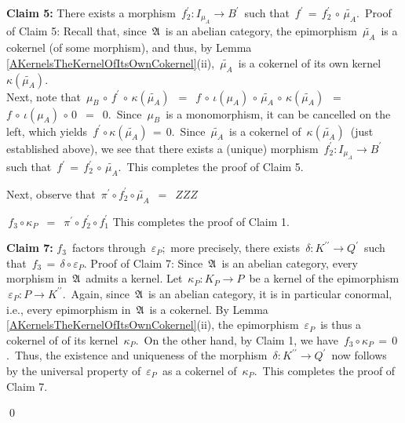 \begin{enumerate}
	\vskip 0.3cm
	\textbf{Claim 5:}\;
	There exists a morphism
	\,$f_{2}^{\prime} : I_{\mu_{A}} \longrightarrow B^{\prime}$\,
	such that
	\,$f^{\prime} \,=\, f_{2}^{\prime} \,\circ\, \widetilde{\mu_{A}}$.\,
	\vskip 0.01cm
	Proof of Claim 5:\;
	Recall that, since \,$\mathfrak{A}$\, is an abelian category,
	the epimorphism \,$\widetilde{\mu_{A}}$\, is a cokernel (of some morphism),
	and thus, by Lemma \ref{AKernelsTheKernelOfItsOwnCokernel}(ii),
	\,$\widetilde{\mu_{A}}$\, is a cokernel of its own kernel
	\,$\kappa(\widetilde{\mu_{A}})$.\,\\
	Next, note that
	\,$\mu_{B} \,\circ\, f^{\prime} \,\circ\, \kappa(\widetilde{\mu_{A}})$
	\,$=$\, $f \,\circ\, \iota(\mu_{A}) \,\circ\, \widetilde{\mu_{A}} \,\circ\, \kappa(\widetilde{\mu_{A}})$
	\,$=$\, $f \,\circ\, \iota(\mu_{A}) \,\circ\, 0$
	\,$=$\, $0$.\,
	Since \,$\mu_{B}$\, is a monomorphism, it can be cancelled on the left,
	which yields
	\,$ f^{\prime} \circ \kappa(\widetilde{\mu_{A}}) \,=\, 0$.\,
	Since \,$\widetilde{\mu_{A}}$\, is a cokernel of \,$\kappa(\widetilde{\mu_{A}})$\, (just established above),
	we see that there exists a (unique) morphism
	\,$f_{2}^{\prime} : I_{\mu_{A}} \longrightarrow B^{\prime}$\,
	such that
	\,$f^{\prime} \,=\, f_{2}^{\prime} \,\circ\, \widetilde{\mu_{A}}$.\,
	This completes the proof of Claim 5.
	

	\vskip 0.3cm
	\noindent
	Next, observe that
	\,$\pi^{\prime} \circ f_{2}^{\prime} \circ \widetilde{\mu_{A}}$
	\,$=$\, $ZZZ$

	\vskip 0.3cm
	\noindent
	\,$f_{3} \circ \kappa_{P}$
	\,$=$\, $\pi^{\prime} \circ f_{2}^{\prime} \circ f_{1}^{\prime}$
	This completes the proof of Claim 1.


	\vskip 0.3cm
	\textbf{Claim 7:} \;$f_{3}$\, factors through \,$\varepsilon_{P}$;\,
	more precisely, there exists
	\,$\delta : K^{\prime\prime} \longrightarrow Q^{\prime}$\,
	such that
	\,$f_{3} \,=\, \delta \circ \varepsilon_{P}$.
	\vskip 0.01cm
	Proof of Claim 7:\;
	Since \,$\mathfrak{A}$\, is an abelian category, every morphism in \,$\mathfrak{A}$\,
	admits a kernel.
	Let \,$\kappa_{P} : K_{P} \longrightarrow P$\, be a kernel of the epimorphism
	\,$\varepsilon_{P} : P \longrightarrow K^{\prime\prime}$.\,
	Again, since \,$\mathfrak{A}$\, is an abelian category, it is in particular conormal, i.e.,
	every epimorphism in \,$\mathfrak{A}$\, is a cokernel.
	By Lemma \ref{AKernelsTheKernelOfItsOwnCokernel}(ii),
	the epimorphism \,$\varepsilon_{P}$\, is thus a cokernel of of its kernel \,$\kappa_{P}$.\,
	On the other hand, by Claim 1, we have \,$f_{3} \circ \kappa_{P} \,=\, 0$.\,
	Thus, the existence and uniqueness of the morphism
	\,$\delta : K^{\prime\prime} \longrightarrow Q^{\prime}$\,
	now follows by the universal property of
	\,$\varepsilon_{P}$\, as a cokernel of \,$\kappa_{P}$.\,
	This completes the proof of Claim 7.
\end{enumerate}
\qed

